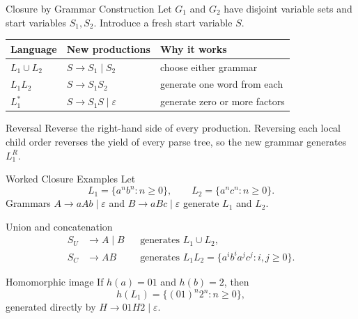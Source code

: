 \documentclass[10pt]{beamer}
\begin{document}
\begin{frame}{Closure by Grammar Construction}
  Let $G_1$ and $G_2$ have disjoint variable sets and start variables $S_1,S_2$.
  Introduce a fresh start variable $S$.
  \begin{center}
  \begin{tabular}{L{2.7cm}L{3.8cm}L{3.7cm}}
    \toprule
    Language & New productions & Why it works \\
    \midrule
    $L_1\cup L_2$ & $S\to S_1\mid S_2$ & choose either grammar \\
    $L_1L_2$ & $S\to S_1S_2$ & generate one word from each \\
    $L_1^*$ & $S\to S_1S\mid\varepsilon$ & generate zero or more factors \\
    \bottomrule
  \end{tabular}
  \end{center}
  \begin{block}{Reversal}
    Reverse the right-hand side of every production. Reversing each local child order reverses the
    yield of every parse tree, so the new grammar generates $L_1^R$.
  \end{block}
\end{frame}

\begin{frame}{Worked Closure Examples}
  \small
  Let
  \[
    L_1=\{a^n b^n:n\ge0\},
    \qquad
    L_2=\{a^n c^n:n\ge0\}.
  \]
  Grammars $A\to aAb\mid\varepsilon$ and
  $B\to aBc\mid\varepsilon$ generate $L_1$ and $L_2$.

  \begin{block}{Union and concatenation}
    \begin{align*}
      S_U&\to A\mid B
        &&\text{generates }L_1\cup L_2,\\
      S_C&\to AB
        &&\text{generates }L_1L_2
          =\{a^i b^i a^j c^j:i,j\ge0\}.
    \end{align*}
  \end{block}
  \begin{exampleblock}{Homomorphic image}
    If $h(a)=01$ and $h(b)=2$, then
    \[
      h(L_1)=\{(01)^n2^n:n\ge0\},
    \]
    generated directly by $H\to 01H2\mid\varepsilon$.
  \end{exampleblock}
\end{frame}
\end{document}
